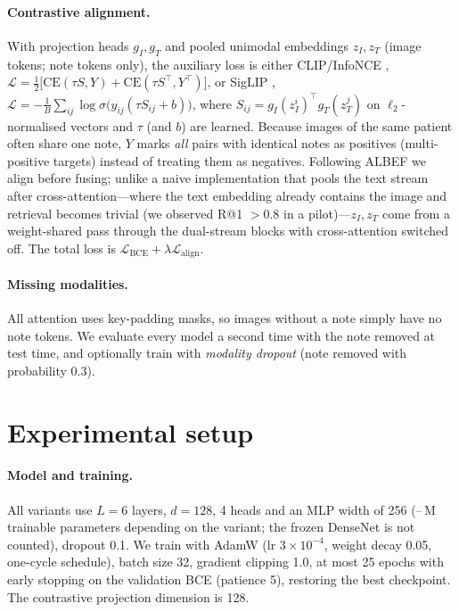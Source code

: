 \paragraph{Contrastive alignment.} With projection heads $g_I,g_T$ and pooled unimodal
embeddings $z_I, z_T$ (image tokens; note tokens only), the auxiliary loss is either
CLIP/InfoNCE \citep{radford2021clip},
$\mathcal{L}=\tfrac12\big[\mathrm{CE}(\tau S, Y)+\mathrm{CE}(\tau S^\top, Y^\top)\big]$,
or SigLIP \citep{zhai2023siglip},
$\mathcal{L}=-\tfrac1B\sum_{ij}\log\sigma\big(y_{ij}(\tau S_{ij}+b)\big)$, where
$S_{ij}=g_I(z_I^i)^\top g_T(z_T^j)$ on $\ell_2$-normalised vectors and $\tau$ (and $b$) are learned.
Because images of the same patient often share one note, $Y$ marks \emph{all} pairs with
identical notes as positives (multi-positive targets) instead of treating them as negatives.
Following ALBEF \citep{li2021albef} we align before fusing; unlike a naive implementation that
pools the text stream after cross-attention---where the text embedding already contains the
image and retrieval becomes trivial (we observed R@1 $>0.8$ in a pilot)---$z_I,z_T$ come from a
weight-shared pass through the dual-stream blocks with cross-attention switched off.
The total loss is $\mathcal{L}_{\text{BCE}}+\lambda\mathcal{L}_{\text{align}}$.

\paragraph{Missing modalities.} All attention uses key-padding masks, so images without a note
simply have no note tokens. We evaluate every model a second time with the note removed at test
time, and optionally train with \emph{modality dropout} (note removed with probability 0.3).

\section{Experimental setup}
\label{sec:setup}
\paragraph{Model and training.} All variants use $L{=}6$ layers, $d{=}128$, 4 heads and an MLP
width of 256 (\ParamMin--\ParamMax\,M trainable parameters depending on the variant; the frozen DenseNet
is not counted), dropout 0.1. We train with AdamW \citep{loshchilov2019adamw}
(lr $3{\times}10^{-4}$, weight decay 0.05, one-cycle schedule), batch size 32, gradient clipping 1.0,
at most 25 epochs with early stopping on the validation BCE (patience 5), restoring the best
checkpoint. The contrastive projection dimension is 128.

